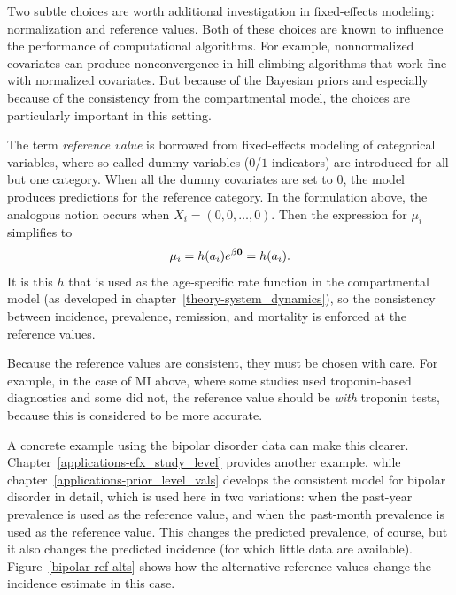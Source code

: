 Two subtle choices are worth additional investigation in fixed-effects
modeling: normalization and reference values.  Both of these choices
are known to influence the performance of computational
algorithms.\cite{gelman_bayesian_2003} For example, nonnormalized covariates can produce
nonconvergence in hill-climbing algorithms that work fine with
normalized covariates.  But because of the Bayesian priors and
especially because of the consistency from the compartmental model,
the choices are particularly important in this setting.

The term \emph{reference value} is borrowed from fixed-effects
modeling of categorical variables, where so-called dummy variables
($0$/$1$ indicators) are introduced for all but one category. When
all the dummy covariates are set to $0$, the model produces
predictions for the reference category. In the formulation above, the
analogous notion occurs when $X_i = (0, 0, \ldots, 0)$.  Then the
expression for $\mu_i$ simplifies to
\[
\mu_i = h(a_i) e^{\beta \mathbf{0}} = h(a_i).
\]
It is this $h$ that is used as the age-specific rate function in
the compartmental model (as developed in
chapter~\ref{theory-system_dynamics}), so the consistency between
incidence, prevalence, remission, and mortality is enforced at the
reference values.

Because the reference values are consistent, they must be chosen with
care.  For example, in the case of MI above, where some studies used
troponin-based diagnostics and some did not, the reference value
should be \emph{with} troponin tests, because this is considered to be
more accurate.

A concrete example using the bipolar disorder data can make this
clearer.  Chapter~\ref{applications-efx_study_level} provides another
example, while chapter~\ref{applications-prior_level_vals} develops
the consistent model for bipolar disorder in detail, which is used
here in two variations: when the past-year prevalence is used
as the reference value, and when the past-month prevalence is
used as the reference value.  This changes the predicted prevalence, of
course, but it also changes the predicted incidence (for which little
data are available).  Figure~\ref{bipolar-ref-alts} shows how the
alternative reference values change the incidence estimate in this
case.



